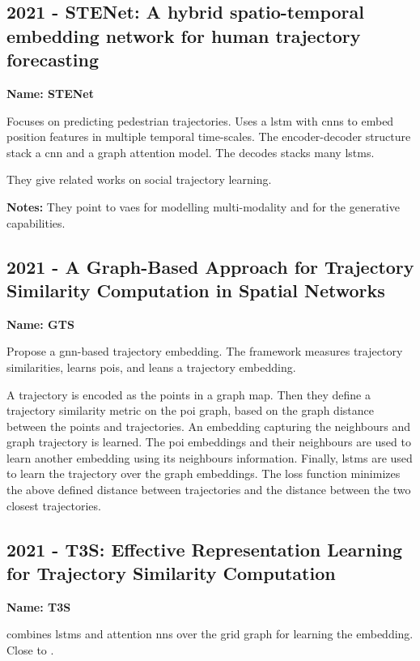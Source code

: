 \subsection*{2021 - STENet: A hybrid spatio-temporal embedding network for human trajectory forecasting}

\textbf{Name: STENet}

\cite{zhang2021stenet} Focuses on predicting pedestrian trajectories. Uses a \gls{lstm} with \glspl{cnn} to embed position features in multiple temporal time-scales. The encoder-decoder structure stack a \gls{cnn} and a graph attention model. The decodes stacks many \glspl{lstm}. 

They give related works on social trajectory learning.

\textbf{Notes:} They point to \glspl{vae} for modelling multi-modality and for the generative capabilities. 

\subsection*{2021 - A Graph-Based Approach for Trajectory Similarity Computation in Spatial Networks}

\textbf{Name: GTS}

\cite{han2021graph} Propose a \gls{gnn}-based trajectory embedding. The framework measures trajectory similarities, learns \glspl{poi}, and leans a trajectory embedding.

A trajectory is encoded as the points in a graph map. Then they define a trajectory similarity metric on the \gls{poi} graph, based on the graph distance between the points and trajectories. An embedding capturing the neighbours and graph trajectory is learned. The \gls{poi} embeddings and their neighbours are used to learn another embedding using its neighbours information. Finally, \glspl{lstm} are used to learn the trajectory over the graph embeddings. The loss function minimizes the above defined distance between trajectories and the distance between the two closest trajectories.

\subsection*{2021 - T3S: Effective Representation Learning for Trajectory Similarity Computation}

\textbf{Name: T3S}

\cite{yang2021t3s} combines \glspl{lstm} and attention \glspl{nn} over the grid graph for learning the embedding. Close to \cite{yao2019computing, zhang2020trajectory, chen2021embedding}.

